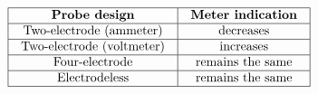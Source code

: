 
$$\vbox{\offinterlineskip
\halign{\strut
\vrule \quad\hfil # \ \hfil & 
\vrule \quad\hfil # \ \hfil \vrule \cr
\noalign{\hrule}
%
{\bf Probe design} & {\bf Meter indication} \cr
%
\noalign{\hrule}
%
Two-electrode (ammeter) & decreases \cr
%
\noalign{\hrule}
%
Two-electrode (voltmeter) & increases \cr
%
\noalign{\hrule}
%
Four-electrode & remains the same \cr
%
\noalign{\hrule}
%
Electrodeless & remains the same \cr
%
\noalign{\hrule}
} %
}$$ %





